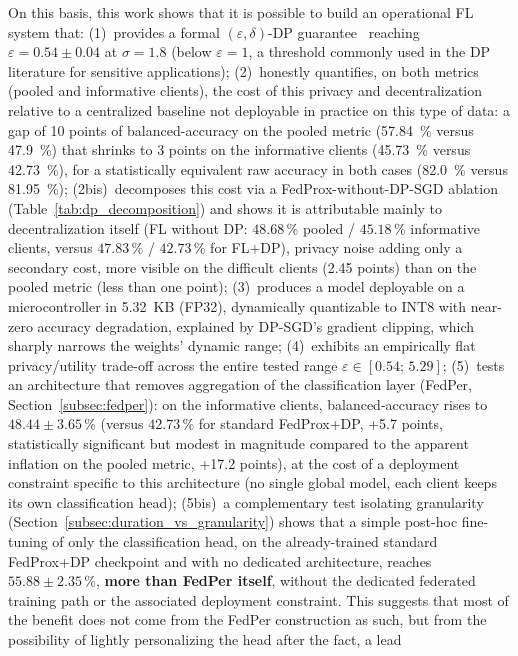 \documentclass{article}
\begin{document}
On this basis, this work shows that it is possible to build an operational FL
system that: (1)~provides a formal $(\varepsilon,
\delta)$-DP guarantee~\cite{dwork2014foundations} reaching $\varepsilon = 0.54 \pm 0.04$ at
$\sigma = 1.8$ (below $\varepsilon = 1$, a threshold commonly used in the DP
literature for sensitive applications); (2)~honestly quantifies, on both metrics
(pooled and informative clients), the cost of this privacy and decentralization
relative to a centralized baseline not deployable in practice on this type of
data: a gap of 10 points of balanced-accuracy on the pooled metric (57.84~\%
versus 47.9~\%) that shrinks to 3 points on the informative clients (45.73~\%
versus 42.73~\%), for a statistically equivalent raw accuracy in both cases
(82.0~\% versus 81.95~\%); (2bis)~decomposes this cost via a FedProx-without-DP-SGD
ablation (Table~\ref{tab:dp_decomposition}) and shows it is attributable
mainly to decentralization itself (FL without DP: $48.68\,\%$ pooled /
$45.18\,\%$ informative clients, versus $47.83\,\%$ / $42.73\,\%$ for FL+DP),
privacy noise adding only a secondary cost, more visible on the difficult
clients (2.45 points) than on the pooled metric (less than one point);
(3)~produces a model deployable on a microcontroller in 5.32~KB (FP32),
dynamically quantizable to INT8 with near-zero accuracy degradation, explained
by DP-SGD's gradient clipping, which sharply narrows the weights' dynamic range;
(4)~exhibits an empirically flat privacy/utility trade-off across the entire
tested range $\varepsilon \in [0.54;\, 5.29]$; (5)~tests an architecture that
removes aggregation of the classification layer (FedPer,
Section~\ref{subsec:fedper}): on the informative clients, balanced-accuracy rises
to $48.44 \pm 3.65\,\%$ (versus $42.73\,\%$ for standard FedProx+DP, +5.7 points,
statistically significant but modest in magnitude compared to the apparent
inflation on the pooled metric, +17.2 points), at the cost of a deployment
constraint specific to this architecture (no single global model, each client
keeps its own classification head); (5bis)~a complementary test isolating
granularity (Section~\ref{subsec:duration_vs_granularity}) shows that a simple
post-hoc fine-tuning of only the classification head, on the already-trained
standard FedProx+DP checkpoint and with no dedicated architecture, reaches
$55.88 \pm 2.35\,\%$, \textbf{more than FedPer itself}, without the dedicated
federated training path or the associated deployment constraint. This suggests
that most of the benefit does not come from the FedPer construction as such, but
from the possibility of lightly personalizing the head after the fact, a lead
\end{document}
